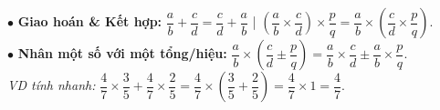 \documentclass[14pt,a4paper,oneside]{extbook}
\begin{document}
\vspace{3mm}

\noindent
\begin{tcolorbox}[
  enhanced,
  title={\footnotesize\bfseries\color{white}\faStar\ 3. Các tính chất tính nhanh với phân số},
  colback=purple!2!white,
  colframe=purple!70!black,
  arc=2.5mm, boxrule=0.8pt, top=1.8mm, bottom=1.8mm, left=2.5mm, right=2.5mm
]
  \footnotesize
  $\bullet$ \textbf{Giao hoán \& Kết hợp:} $\dfrac{a}{b} + \dfrac{c}{d} = \dfrac{c}{d} + \dfrac{a}{b}$ \quad | \quad $\left(\dfrac{a}{b} \times \dfrac{c}{d}\right) \times \dfrac{p}{q} = \dfrac{a}{b} \times \left(\dfrac{c}{d} \times \dfrac{p}{q}\right)$.\\
  $\bullet$ \textbf{Nhân một số với một tổng/hiệu:} $\dfrac{a}{b} \times \left(\dfrac{c}{d} \pm \dfrac{p}{q}\right) = \dfrac{a}{b} \times \dfrac{c}{d} \pm \dfrac{a}{b} \times \dfrac{p}{q}$.\\
  \textit{VD tính nhanh:} $\dfrac{4}{7} \times \dfrac{3}{5} + \dfrac{4}{7} \times \dfrac{2}{5} = \dfrac{4}{7} \times \left(\dfrac{3}{5} + \dfrac{2}{5}\right) = \dfrac{4}{7} \times 1 = \dfrac{4}{7}$.
\end{tcolorbox}

\vspace{3mm}
\end{document}
